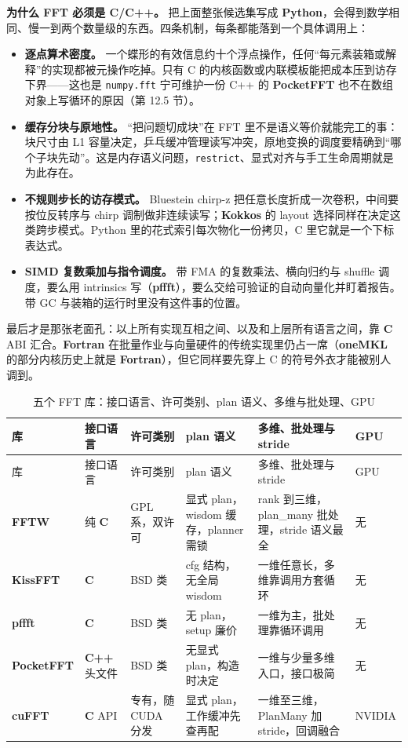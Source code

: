 \documentclass[12pt,a4paper,fontset=fandol]{ctexbook}
\newcommand{\Tp}[1]{\texttt{#1}}
\newcommand{\Bk}{\allowbreak}
\newcommand{\Lib}[1]{\textbf{#1}}
\newcommand{\Lang}[1]{\textsf{\bfseries #1}}
\newcommand{\CL}{\Lang{C}}
\newcommand{\CPP}{\Lang{C++}}
\newcommand{\FTN}{\Lang{Fortran}}
\newcommand{\PY}{\Lang{Python}}
\begin{document}
\textbf{为什么 FFT 必须是 \CL{}/{\Bk}\CPP{}。} 把上面整张候选集写成 \PY{}，会得到数学相同、慢一到两个数量级的东西。四条机制，每条都能落到一个具体调用上：

\begin{itemize}
\item \textbf{逐点算术密度。} 一个蝶形的有效信息约十个浮点操作，任何``每元素装箱或解释''的实现都被元操作吃掉。只有 C 的内核函数或内联模板能把成本压到访存下界——这也是 \Tp{numpy.fft} 宁可维护一份 C++ 的 \Lib{PocketFFT} 也不在数组对象上写循环的原因（第 12.5 节）。
\item \textbf{缓存分块与原地性。} ``把问题切成块''在 FFT 里不是语义等价就能完工的事：块尺寸由 L1 容量决定，乒乓缓冲管理读写冲突，原地变换的调度要精确到``哪个子块先动''。这是内存语义问题，\Tp{restrict}、显式对齐与手工生命周期就是为此存在。
\item \textbf{不规则步长的访存模式。} Bluestein chirp-z 把任意长度折成一次卷积，中间要按位反转序与 chirp 调制做非连续读写；\Lib{Kokkos} 的 layout 选择同样在决定这类跨步模式。Python 里的花式索引每次物化一份拷贝，C 里它就是一个下标表达式。
\item \textbf{SIMD 复数乘加与指令调度。} 带 FMA 的复数乘法、横向归约与 shuffle 调度，要么用 intrinsics 写（\Lib{pffft}），要么交给可验证的自动向量化并盯着报告。带 GC 与装箱的运行时里没有这件事的位置。
\end{itemize}

最后才是那张老面孔：以上所有实现互相之间、以及和上层所有语言之间，靠 \CL{} ABI 汇合。\FTN{} 在批量作业与向量硬件的传统实现里仍占一席（\Lib{oneMKL} 的部分内核历史上就是 \FTN{}），但它同样要先穿上 C 的符号外衣才能被别人调到。

\begin{longtable}{@{}>{\raggedright\arraybackslash}p{}
  >{\raggedright\arraybackslash}p{}
  >{\raggedright\arraybackslash}p{}
  >{\raggedright\arraybackslash}p{}
  >{\raggedright\arraybackslash}p{}
  >{\raggedright\arraybackslash}p{}@{}}
\caption{五个 FFT 库：接口语言、许可类别、plan 语义、多维与批处理、GPU}\label{tab:ch12-libs}\\
\toprule
库 & 接口语言 & 许可类别 & plan 语义 & 多维、批处理与 stride & GPU \\
\midrule
\endfirsthead
\toprule
库 & 接口语言 & 许可类别 & plan 语义 & 多维、批处理与 stride & GPU \\
\midrule
\endhead
\bottomrule
\endfoot
\Lib{FFTW} & 纯 \CL{} & GPL 系，双许可 &
  显式 plan，wisdom 缓存，planner 需锁 &
  rank 到三维，plan\_many 批处理，stride 语义最全 & 无 \\
\Lib{KissFFT} & \CL{} & BSD 类 &
  cfg 结构，无全局 wisdom &
  一维任意长，多维靠调用方套循环 & 无 \\
\Lib{pffft} & \CL{} & BSD 类 &
  无 plan，setup 廉价 &
  一维为主，批处理靠循环调用 & 无 \\
\Lib{PocketFFT} & \CPP{} 头文件 & BSD 类 &
  无显式 plan，构造时决定 &
  一维与少量多维入口，接口极简 & 无 \\
\Lib{cuFFT} & \CL{} API & 专有，随 CUDA 分发 &
  显式 plan，工作缓冲先查再配 &
  一维至三维，PlanMany 加 stride，回调融合 & NVIDIA \\
\end{longtable}
\end{document}
